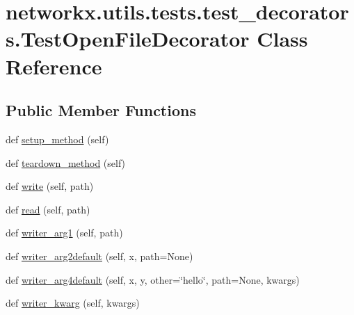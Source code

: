 \hypertarget{classnetworkx_1_1utils_1_1tests_1_1test__decorators_1_1TestOpenFileDecorator}{}\section{networkx.\+utils.\+tests.\+test\+\_\+decorators.\+Test\+Open\+File\+Decorator Class Reference}
\label{classnetworkx_1_1utils_1_1tests_1_1test__decorators_1_1TestOpenFileDecorator}
\subsection*{Public Member Functions}
\begin{DoxyCompactItemize}
\item 
def \hyperlink{classnetworkx_1_1utils_1_1tests_1_1test__decorators_1_1TestOpenFileDecorator_a84ed2bad795d95da991342a0abe562af}{setup\+\_\+method} (self)
\item 
def \hyperlink{classnetworkx_1_1utils_1_1tests_1_1test__decorators_1_1TestOpenFileDecorator_a5cb89f7e45a0f3baf0acc1f178d1ee52}{teardown\+\_\+method} (self)
\item 
def \hyperlink{classnetworkx_1_1utils_1_1tests_1_1test__decorators_1_1TestOpenFileDecorator_a6441764a5e1ff7b186357303cd7c0c6b}{write} (self, path)
\item 
def \hyperlink{classnetworkx_1_1utils_1_1tests_1_1test__decorators_1_1TestOpenFileDecorator_aba33356bb009b2d9f0f67cee71a86643}{read} (self, path)
\item 
def \hyperlink{classnetworkx_1_1utils_1_1tests_1_1test__decorators_1_1TestOpenFileDecorator_aa49f86ef19b4815615fe57a4173ba328}{writer\+\_\+arg1} (self, path)
\item 
def \hyperlink{classnetworkx_1_1utils_1_1tests_1_1test__decorators_1_1TestOpenFileDecorator_a5556265cf0562df66bac75781232ccdb}{writer\+\_\+arg2default} (self, x, path=None)
\item 
def \hyperlink{classnetworkx_1_1utils_1_1tests_1_1test__decorators_1_1TestOpenFileDecorator_a299ad010cbec3f266b85bec562508f3d}{writer\+\_\+arg4default} (self, x, y, other=\char`\"{}hello\char`\"{}, path=None, kwargs)
\item 
def \hyperlink{classnetworkx_1_1utils_1_1tests_1_1test__decorators_1_1TestOpenFileDecorator_aa2513081f1cc819e874c11f6bc713c99}{writer\+\_\+kwarg} (self, kwargs)
\item 

\end{DoxyCompactItemize}
